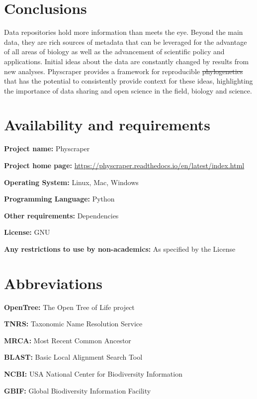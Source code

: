 \documentclass{bmcart}
\providecommand{\DIFaddtex}[1]{{\protect\color{blue}\uwave{#1}}} %
\providecommand{\DIFdeltex}[1]{{\protect\color{red}\sout{#1}}}                      %
\providecommand{\DIFaddbegin}{} %
\providecommand{\DIFaddend}{} %
\providecommand{\DIFdelbegin}{} %
\providecommand{\DIFdelend}{} %
\providecommand{\DIFadd}[1]{\texorpdfstring{\DIFaddtex{#1}}{#1}} %
\providecommand{\DIFdel}[1]{\texorpdfstring{\DIFdeltex{#1}}{}} %
\begin{document}
\section*{Conclusions}
Data repositories hold more information than meets the eye.
Beyond the main data, they are rich sources of metadata that can be leveraged
for the advantage of all areas of biology as well as the advancement of scientific
policy and applications.
Initial ideas about the data are constantly changed by results from new analyses.
Physcraper provides a framework for reproducible \DIFdelbegin \DIFdel{phylogenetics }\DIFdelend \DIFaddbegin \DIFadd{Phylogenetics }\DIFaddend that has the
potential to consistently provide context for these ideas, highlighting the
importance of data sharing and open science in the field, biology and science.

\section*{Availability and requirements}

\textbf{Project name:} Physcraper

\textbf{Project home page:} \href{https://physcraper.readthedocs.io/en/latest/index.html}{https://physcraper.readthedocs.io/en/latest/index.html}

\textbf{Operating System:} Linux, Mac, Windows

\textbf{Programming Language:} Python

\textbf{Other requirements:} Dependencies

\textbf{License:} GNU

\textbf{Any restrictions to use by non-academics:} As specified by the License

\section*{Abbreviations}

\textbf{OpenTree:} The Open Tree of Life project

\textbf{TNRS:} Taxonomic Name Resolution Service

\textbf{MRCA:} Most Recent Common Ancestor

\textbf{BLAST:} Basic Local Alignment Search Tool

\textbf{NCBI:} USA National Center for Biodiversity Information

\textbf{GBIF:} Global Biodiversity Information Facility

\end{document}
